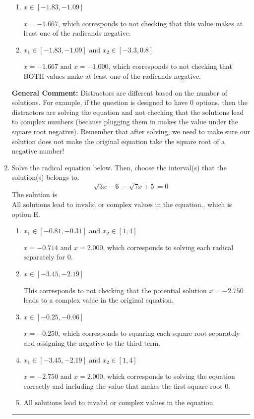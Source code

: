 \documentclass{extbook}[14pt]
\newcommand{\litem}[1]{\item #1

\rule{\textwidth}{0.4pt}}
\begin{document}
\begin{enumerate}
{\begin{enumerate}[label=\Alph*.]
$x = -1.000$, which corresponds to not checking that this value makes at least one of the radicands negative.
\item \( x \in [-1.83,-1.09] \)

$x = -1.667$, which corresponds to not checking that this value makes at least one of the radicands negative.
\item \( x_1 \in [-1.83, -1.09] \text{ and } x_2 \in [-3.3,0.8] \)

$x = -1.667 \text{ and } x = -1.000$, which corresponds to not checking that BOTH values make at least one of the radicands negative.
\end{enumerate}

\textbf{General Comment:} Distractors are different based on the number of solutions. For example, if the question is designed to have 0 options, then the distractors are solving the equation and not checking that the solutions lead to complex numbers (because plugging them in makes the value under the square root negative). Remember that after solving, we need to make sure our solution does not make the original equation take the square root of a negative number!
}
\litem{
Solve the radical equation below. Then, choose the interval(s) that the solution(s) belongs to.
\[ \sqrt{3 x - 6} - \sqrt{7 x + 5} = 0 \]The solution is \( \text{All solutions lead to invalid or complex values in the equation.} \), which is option E.\begin{enumerate}[label=\Alph*.]
\item \( x_1 \in [-0.81, -0.31] \text{ and } x_2 \in [1,4] \)

$x = -0.714$ and $x = 2.000$, which corresponds to solving each radical separately for 0.
\item \( x \in [-3.45,-2.19] \)

This corresponds to not checking that the potential solution $x = -2.750$ leads to a complex value in the original equation.
\item \( x \in [-0.25,-0.06] \)

$x = -0.250$, which corresponds to squaring each square root separately and assigning the negative to the third term.
\item \( x_1 \in [-3.45, -2.19] \text{ and } x_2 \in [1,4] \)

$x = -2.750$ and $x = 2.000$, which corresponds to solving the equation correctly and including the value that makes the first square root 0.
\item \( \text{All solutions lead to invalid or complex values in the equation.} \)


\end{enumerate}}
\end{enumerate}
\end{document}
